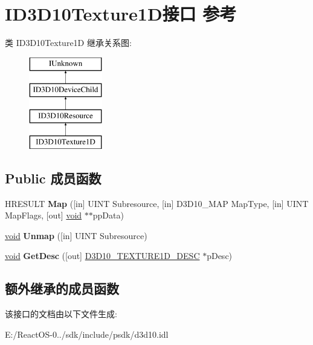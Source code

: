 \hypertarget{interface_i_d3_d10_texture1_d}{}\section{I\+D3\+D10\+Texture1\+D接口 参考}
\label{interface_i_d3_d10_texture1_d}
类 I\+D3\+D10\+Texture1D 继承关系图\+:\begin{figure}[H]
\begin{center}
\leavevmode
\includegraphics[height=4.000000cm]{interface_i_d3_d10_texture1_d}
\end{center}
\end{figure}
\subsection*{Public 成员函数}
\begin{DoxyCompactItemize}
\item 
\mbox{\label{interface_i_d3_d10_texture1_d_a9def88968ee525c5826d17e048cee326}} 
H\+R\+E\+S\+U\+LT {\bfseries Map} (\mbox{[}in\mbox{]} U\+I\+NT Subresource, \mbox{[}in\mbox{]} D3\+D10\+\_\+\+M\+AP Map\+Type, \mbox{[}in\mbox{]} U\+I\+NT Map\+Flags, \mbox{[}out\mbox{]} \hyperlink{interfacevoid}{void} $\ast$$\ast$pp\+Data)
\item 
\mbox{\label{interface_i_d3_d10_texture1_d_a6871d04c572d3c67a4a1d7db6a7c4a38}} 
\hyperlink{interfacevoid}{void} {\bfseries Unmap} (\mbox{[}in\mbox{]} U\+I\+NT Subresource)
\item 
\mbox{\label{interface_i_d3_d10_texture1_d_af832b73defe23f0fa0ae40c0f0952e36}} 
\hyperlink{interfacevoid}{void} {\bfseries Get\+Desc} (\mbox{[}out\mbox{]} \hyperlink{struct_d3_d10___t_e_x_t_u_r_e1_d___d_e_s_c}{D3\+D10\+\_\+\+T\+E\+X\+T\+U\+R\+E1\+D\+\_\+\+D\+E\+SC} $\ast$p\+Desc)
\end{DoxyCompactItemize}
\subsection*{额外继承的成员函数}


该接口的文档由以下文件生成\+:\begin{DoxyCompactItemize}
\item 
E\+:/\+React\+O\+S-\/0../sdk/include/psdk/d3d10.\+idl\end{DoxyCompactItemize}
